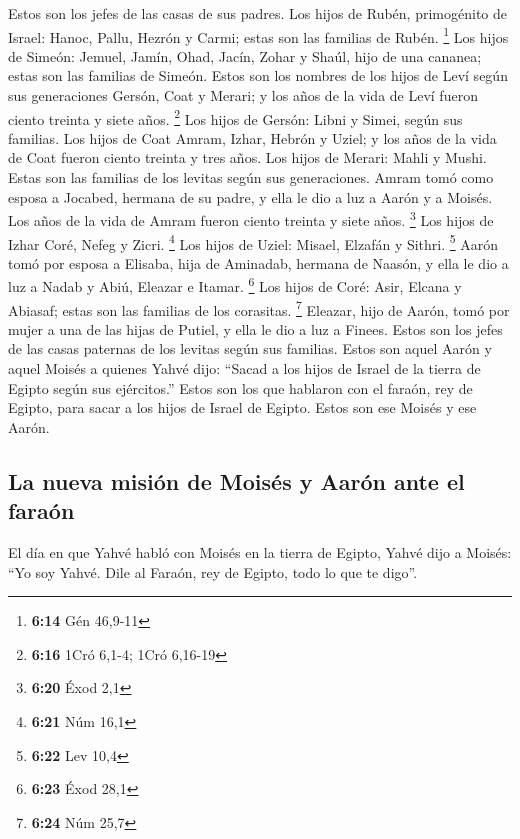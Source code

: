  Estos son los jefes de las casas de sus padres. Los
hijos de Rubén, primogénito de Israel: Hanoc, Pallu, Hezrón y Carmi;
estas son las familias de Rubén. \footnote{\textbf{6:14} Gén 46,9-11}
 Los hijos de Simeón: Jemuel, Jamín, Ohad, Jacín, Zohar y
Shaúl, hijo de una cananea; estas son las familias de Simeón.
 Estos son los nombres de los hijos de Leví según sus
generaciones Gersón, Coat y Merari; y los años de la vida de Leví fueron
ciento treinta y siete años. \footnote{\textbf{6:16} 1Cró 6,1-4; 1Cró
  6,16-19}  Los hijos de Gersón: Libni y Simei, según sus
familias.  Los hijos de Coat Amram, Izhar, Hebrón y
Uziel; y los años de la vida de Coat fueron ciento treinta y tres años.
 Los hijos de Merari: Mahli y Mushi. Estas son las
familias de los levitas según sus generaciones.  Amram
tomó como esposa a Jocabed, hermana de su padre, y ella le dio a luz a
Aarón y a Moisés. Los años de la vida de Amram fueron ciento treinta y
siete años. \footnote{\textbf{6:20} Éxod 2,1}  Los hijos
de Izhar Coré, Nefeg y Zicri. \footnote{\textbf{6:21} Núm 16,1}
 Los hijos de Uziel: Misael, Elzafán y Sithri.
\footnote{\textbf{6:22} Lev 10,4}  Aarón tomó por esposa
a Elisaba, hija de Aminadab, hermana de Naasón, y ella le dio a luz a
Nadab y Abiú, Eleazar e Itamar. \footnote{\textbf{6:23} Éxod 28,1}
 Los hijos de Coré: Asir, Elcana y Abiasaf; estas son las
familias de los corasitas. \footnote{\textbf{6:24} Núm 25,7}
 Eleazar, hijo de Aarón, tomó por mujer a una de las
hijas de Putiel, y ella le dio a luz a Finees. Estos son los jefes de
las casas paternas de los levitas según sus familias. 
Estos son aquel Aarón y aquel Moisés a quienes Yahvé dijo: ``Sacad a los
hijos de Israel de la tierra de Egipto según sus ejércitos.''
 Estos son los que hablaron con el faraón, rey de Egipto,
para sacar a los hijos de Israel de Egipto. Estos son ese Moisés y ese
Aarón.

\hypertarget{la-nueva-misiuxf3n-de-moisuxe9s-y-aaruxf3n-ante-el-farauxf3n}{%
\subsection{La nueva misión de Moisés y Aarón ante el
faraón}\label{la-nueva-misiuxf3n-de-moisuxe9s-y-aaruxf3n-ante-el-farauxf3n}}

 El día en que Yahvé habló con Moisés en la tierra de
Egipto,  Yahvé dijo a Moisés: ``Yo soy Yahvé. Dile al
Faraón, rey de Egipto, todo lo que te digo''.

